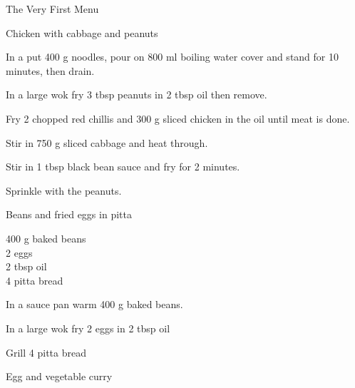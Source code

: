 \begin{menu}{The Very First Menu}
\begin{recipe}{2}{Chicken with cabbage and peanuts}
\begin{ingredients}
		\end{ingredients}
	
    \begin{instructions}
    \item 
      In a 
      put
      400 g  noodles,
      pour on
      800 ml  boiling water
      cover and stand for 10 minutes, then drain.
    \item 
        In a large wok	fry
        3 tbsp  peanuts
        in
        2 tbsp  oil
        then remove.
      \item 
        Fry 2  chopped red chillis
        and
        300 g sliced chicken
        in the oil until meat is done.
      \item 
        Stir in
        750 g sliced cabbage
        and heat through.
      \item 
        Stir in
        1 tbsp  black bean sauce
        and fry for 2 minutes.
      \item 
        Sprinkle with the peanuts.
      
    \end{instructions}
    \end{recipe}%
  
    \begin{recipe}{1}{Beans and fried eggs in pitta}%
    
		\begin{ingredients}
		400 g baked beans  \\
	2  eggs  \\
	2 tbsp oil  \\
	4  pitta bread  \\
	
		\end{ingredients}
	
    \begin{instructions}
    \item 
        In a sauce pan warm
        400 g  baked beans.
      \item 
        In a large wok fry
        2   eggs
        in
        2 tbsp  oil\item 
        Grill
        4   pitta bread
    \end{instructions}
    \end{recipe}%
  
    \begin{recipe}{2}{Egg and vegetable curry}%
    
	

\end{recipe}
\end{menu}
